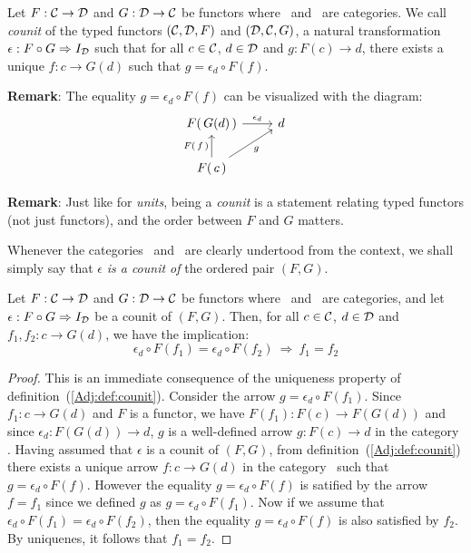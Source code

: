 \begin{defin}\label{Adj:def:counit}
    Let $F:\mbox{$\cal C$}\to\mbox{$\cal D$}$ and $G:\mbox{$\cal D$}\to\mbox{$\cal C$}$ be functors where \Cat\ and \Dat\ 
    are categories. We call {\em counit} of the typed functors $(\mbox{$\cal C$},\mbox{$\cal D$},F)$
    and $(\mbox{$\cal D$},\mbox{$\cal C$},G)$, a natural transformation 
    $\epsilon:F\circ G\Rightarrow I_{\cal D}$ such that for all 
    $c\in\mbox{$\cal C$}$, $d\in\mbox{$\cal D$}$ and $g:F(c)\to d$, there exists a
    unique $f:c \to G(d)$ such that $g = \epsilon_{d}\circ F(f)$.
\end{defin}

\noindent
{\bf Remark}: The equality $g = \epsilon_{d}\circ F(f)$ can be visualized with
the diagram:
    \[
        \begin{tikzcd}
            F(\,G(d)\,)\arrow[r,"\epsilon_{d}"]
            &d\\
            F(\,c\,)\arrow[ru,swap,"g"]\arrow[u,"F(\,f\,)"]
        \end{tikzcd}
    \]

\noindent
{\bf Remark}: Just like for {\em units}, being a {\em counit} is a statement
relating typed functors (not just functors), and the order between $F$ and 
$G$ matters.

\begin{notation}\label{Adj:notation:counit}
    Whenever the categories \Cat\ and \Dat\ are clearly undertood from the 
    context, we shall simply say that $\epsilon$ {\em is a counit of} the
    ordered pair $(F,G)$.
\end{notation}

\begin{prop}\label{Adj:prop:counit:proving:equality}
    Let $F:\mbox{$\cal C$}\to\mbox{$\cal D$}$ and $G:\mbox{$\cal D$}\to\mbox{$\cal C$}$ be functors where \Cat\ and \Dat\ 
    are categories, and let $\epsilon:F\circ G\Rightarrow I_{\cal D}$ be a counit 
    of $(F,G)$. Then, for all $c\in\mbox{$\cal C$}$, $d\in\mbox{$\cal D$}$ and $f_{1},f_{2}:c\to G(d)$,
    we have the implication:
        \[
            \epsilon_{d}\circ F(f_{1}) = \epsilon_{d}\circ F(f_{2})\ 
            \Rightarrow\ 
            f_{1}=f_{2}
        \]
\end{prop}
\begin{proof}
    This is an immediate consequence of the uniqueness property of
    definition~(\ref{Adj:def:counit}). Consider the arrow 
    $g=\epsilon_{d}\circ F(f_{1})$. Since $f_{1}:c\to G(d)$ and $F$ is a 
    functor, we have 
    $F(f_{1}):F(c)\to F(G(d))$ and since $\epsilon_{d}:F(G(d))\to d$, 
    $g$ is a well-defined arrow $g:F(c)\to d$ in the category \Dat. Having
    assumed that $\epsilon$ is a counit of $(F,G)$, from 
    definition~(\ref{Adj:def:counit}) there exists a unique arrow 
    $f:c\to G(d)$ in the category \Cat\ such that $g=\epsilon_{d}\circ F(f)$.
    However the equality $g=\epsilon_{d}\circ F(f)$ is satified by the 
    arrow $f=f_{1}$ since we defined $g$ as $g=\epsilon_{d}\circ F(f_{1})$.
    Now if we assume that $\epsilon_{d}\circ F(f_{1})=\epsilon_{d}\circ F(f_{2})$,
    then the equality $g=\epsilon_{d}\circ F(f)$ is also satisfied by $f_{2}$.
    By uniquenes, it follows that $f_{1}=f_{2}$.
\end{proof}

